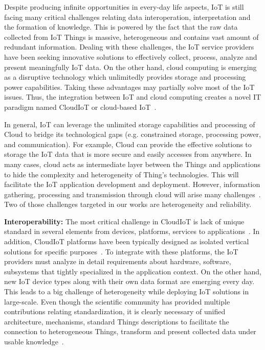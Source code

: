 Despite producing infinite opportunities in every-day life aspects, IoT is still facing many critical challenges relating data interoperation, interpretation and the formation of knowledge. This is powered by the fact that the raw data collected from IoT Things is massive, heterogeneous and contains vast amount of redundant information. Dealing with these challenges, the IoT service providers have been seeking innovative solutions to effectively collect, process, analyze and present meaningfully IoT data. On the other hand, cloud computing is emerging as a disruptive technology which unlimitedly provides storage and processing power capabilities. Taking these advantages may partially solve most of the IoT issues. Thus, the integration between IoT and cloud computing creates a novel IT paradigm named CloudIoT or cloud-based IoT~\cite{fox2012architecture}\cite{dash2010survey}\cite{suciu2013smart}. 

In general, IoT can leverage the unlimited storage capabilities and processing of Cloud to bridge its technological gaps (e.g. constrained storage, processing power, and communication). For example, Cloud can provide the effective solutions to storage the IoT data that is more secure and easily accesses from anywhere. In many cases, cloud acts as intermediate layer between the Things and applications to hide the complexity and heterogeneity of Thing's technologies. This will facilitate the IoT application development and deployment. However, information gathering, processing and transmission through cloud will arise many challenges~\cite{aguzzi2013definition}. Two of those challenges targeted in our works are heterogeneity and reliability.   \\

\par \textbf{Interoperability: } The most critical challenge in CloudIoT is lack of unique standard in several elements from devices, platforms, services to applications~\cite{bandyopadhyay2011internet}. In addition, CloudIoT platforms have been typically designed as isolated vertical solutions for specific purposes~\cite{dinh2013survey}. To integrate with these platforms, the IoT providers must analyze in detail requirements about hardware, software, subsystems that tightly specialized in the application context. On the other hand, new IoT device types along with their own data format are emerging every day. This leads to a big challenge of heterogeneity while deploying IoT solutions in large-scale. Even though the scientific community has provided multiple contributions relating standardization, it is clearly necessary of unified architecture, mechanisms, standard Things descriptions to facilitate the connection to heterogeneous Things, transform and present collected data under usable knowledge~\cite{Botta2016}.\\

